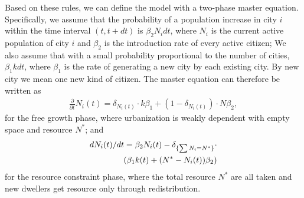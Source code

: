 \documentclass[reprint,unsortedaddress,amsmath,amssymb,aps,prl,showkeys]{revtex4-2}
\begin{document}
Based on these rules, we can define the model with a two-phase master equation. Specifically, we assume that the probability of a population increase in city $i$ within the time interval $(t,t+dt)$ is $\beta_2N_idt$, where $N_i$ is the current active population of city $i$ and $\beta_2$ is the introduction rate of every active citizen;
We also assume that with a small probability proportional to the number of cities, $\beta_1kdt$, where $\beta_1$ is the rate of generating a new city by each existing city. By new city we mean one new kind of citizen. %
The master equation can therefore be written as \begin{align}\frac{\partial}{\partial t}N_i(t) =  \delta_{N_i(t)}\cdot k\beta_1+ (1-\delta_{N_i(t)})\cdot N\beta_2, \end{align} for the free growth phase, where urbanization is weakly dependent with empty space and resource $N^*$;
and \begin{align}
dN_i(t)/dt = \beta_2 N_i(t) -\delta_{\{\sum N_i = N^*\}}\cdot\notag \\ \left(\beta_1k(t) + (N^*-N_i(t))\beta_2 \right)
\end{align}
for the resource constraint phase, where the total resource $N^*$ are all taken and new dwellers get resource only through redistribution. 
\end{document}
